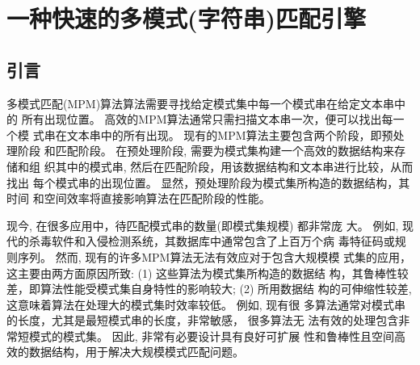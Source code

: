 





\chapter{一种快速的多模式(字符串)匹配引擎}
\label{chap:MPM}

\section{引言}
\label{sec:2_introduction}


多模式匹配(MPM)算法算法需要寻找给定模式集中每一个模式串在给定文本串中的
所有出现位置。 高效的MPM算法通常只需扫描文本串一次，便可以找出每一个模
式串在文本串中的所有出现。 现有的MPM算法主要包含两个阶段，即预处理阶段
和匹配阶段。 在预处理阶段, 需要为模式集构建一个高效的数据结构来存储和组
织其中的模式串, 然后在匹配阶段，用该数据结构和文本串进行比较，从而找出
每个模式串的出现位置。 显然，预处理阶段为模式集所构造的数据结构，其时间
和空间效率将直接影响算法在匹配阶段的性能。

现今, 在很多应用中，待匹配模式串的数量(即模式集规模) 都非常庞
大。 例如, 现代的杀毒软件和入侵检测系统，其数据库中通常包含了上百万个病
毒特征码或规则序列。 然而, 现有的许多MPM算法无法有效应对于包含大规模模
式集的应用，这主要由两方面原因所致: (1) 这些算法为模式集所构造的数据结
构，其鲁棒性较差，即算法性能受模式集自身特性的影响较大; (2) 所用数据结
构的可伸缩性较差, 这意味着算法在处理大的模式集时效率较低。 例如, 现有很
多算法通常对模式串的长度，尤其是最短模式串的长度，非常敏感， 很多算法无
法有效的处理包含非常短模式的模式集。 因此, 非常有必要设计具有良好可扩展
性和鲁棒性且空间高效的数据结构，用于解决大规模模式匹配问题。

